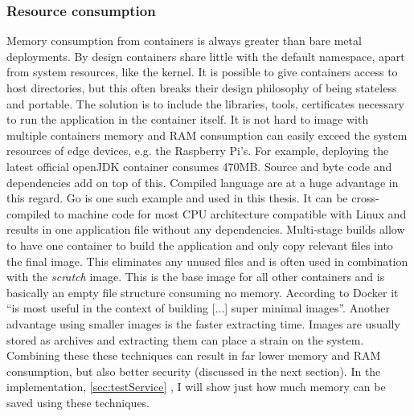 \subsubsection{Resource consumption}
Memory consumption from containers is always greater than bare metal deployments. By design containers share little with the default namespace, apart from system resources, like the kernel. It is possible to give containers access to host directories, but this often breaks their design philosophy of being stateless and portable. The solution is to include the libraries, tools, certificates necessary to run the application in the container itself. It is not hard to image with multiple containers memory and RAM consumption can easily exceed the system resources of edge devices, e.g. the Raspberry Pi’s. For example, deploying the latest official openJDK container consumes 470MB. Source and byte code and dependencies add on top of this. Compiled language are at a huge advantage in this regard. Go is one such example and used in this thesis. It can be cross-compiled to machine code for most CPU architecture compatible with Linux and results in one application file without any dependencies. Multi-stage builds allow to have one container to build the application and only copy relevant files into the final image. This eliminates any unused files and is often used in combination with the \textit{scratch} image. This is the base image for all other containers and is basically an empty file structure consuming no memory. According to Docker it ``is most useful in the context of building [...] super minimal images''\cite{scratchImageDockerD65:online}. Another advantage using smaller images is the faster extracting time. Images are usually stored as archives and extracting them can place a strain on the system. \\
Combining these these techniques can result in far lower memory and RAM consumption, but also better security (discussed in the next section). In the implementation, \cref{sec:testService} , I will show just how much memory can be saved using these techniques. 
